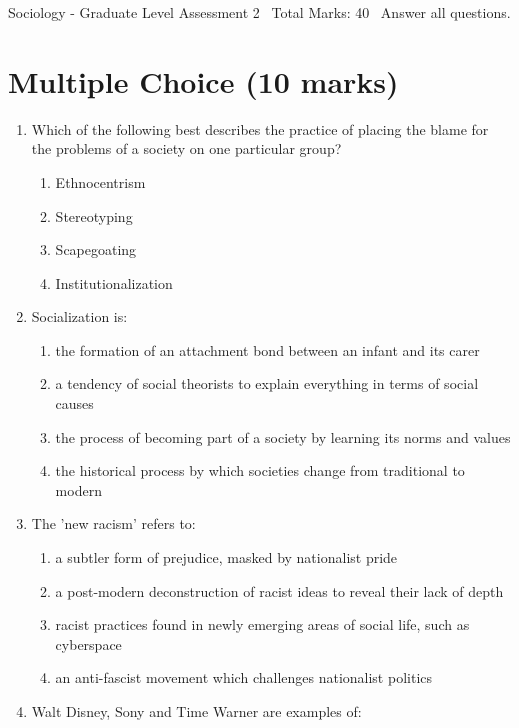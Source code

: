 \documentclass[12pt]{article}
\begin{document}
\begin{center}
Sociology - Graduate Level Assessment 2 \
Total Marks: 40 \
Answer all questions.
\end{center}

\section*{Multiple Choice (10 marks)}
\begin{enumerate}[label=\arabic*.]
\item Which of the following best describes the practice of placing the blame for the problems of a society on one particular group?
\begin{enumerate}[label=(\alph*)]
    \item Ethnocentrism
    \item Stereotyping
    \item Scapegoating
    \item Institutionalization
\end{enumerate}
\item Socialization is:
\begin{enumerate}[label=(\alph*)]
    \item the formation of an attachment bond between an infant and its carer
    \item a tendency of social theorists to explain everything in terms of social causes
    \item the process of becoming part of a society by learning its norms and values
    \item the historical process by which societies change from traditional to modern
\end{enumerate}
\item The 'new racism' refers to:
\begin{enumerate}[label=(\alph*)]
    \item a subtler form of prejudice, masked by nationalist pride
    \item a post-modern deconstruction of racist ideas to reveal their lack of depth
    \item racist practices found in newly emerging areas of social life, such as cyberspace
    \item an anti-fascist movement which challenges nationalist politics
\end{enumerate}
\item Walt Disney, Sony and Time Warner are examples of:
\begin{enumerate}[label=(\alph*)]

\end{enumerate}
\end{enumerate}
\end{document}
